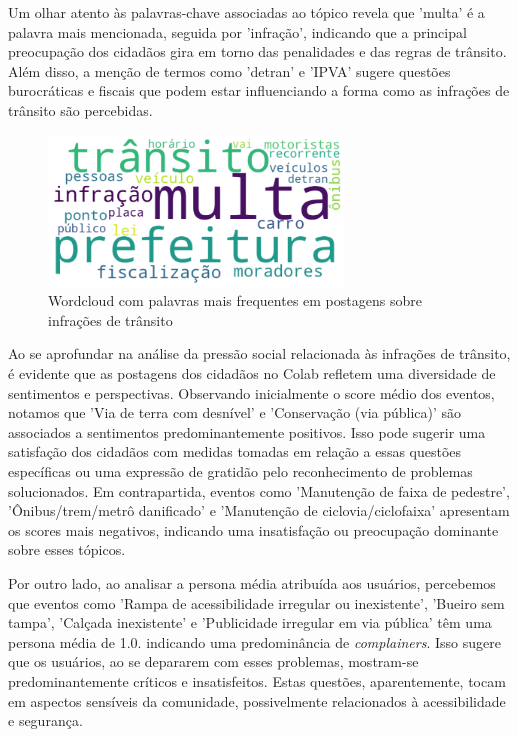 Um olhar atento às palavras-chave associadas ao tópico revela que 'multa' é a palavra mais mencionada, seguida por 'infração', indicando que a principal preocupação dos cidadãos gira em torno das penalidades e das regras de trânsito. Além disso, a menção de termos como 'detran' e 'IPVA' sugere questões burocráticas e fiscais que podem estar influenciando a forma como as infrações de trânsito são percebidas.

\begin{figure}[htb]
	\centering
	\includegraphics[width=0.7\textwidth]{images/wordcloud_traffic.png}
	\caption{Wordcloud com palavras mais frequentes em postagens sobre infrações de trânsito}
	\label{fig:wordcloud_traffic}
\end{figure}

Ao se aprofundar na análise da pressão social relacionada às infrações de trânsito, é evidente que as postagens dos cidadãos no Colab refletem uma diversidade de sentimentos e perspectivas. Observando inicialmente o score médio dos eventos, notamos que 'Via de terra com desnível' e 'Conservação (via pública)' são associados a sentimentos predominantemente positivos. Isso pode sugerir uma satisfação dos cidadãos com medidas tomadas em relação a essas questões específicas ou uma expressão de gratidão pelo reconhecimento de problemas solucionados. Em contrapartida, eventos como 'Manutenção de faixa de pedestre', 'Ônibus/trem/metrô danificado' e 'Manutenção de ciclovia/ciclofaixa' apresentam os scores mais negativos, indicando uma insatisfação ou preocupação dominante sobre esses tópicos.

Por outro lado, ao analisar a persona média atribuída aos usuários, percebemos que eventos como 'Rampa de acessibilidade irregular ou inexistente', 'Bueiro sem tampa', 'Calçada inexistente' e 'Publicidade irregular em via pública' têm uma persona média de 1.0. indicando uma predominância de \textit{complainers}. Isso sugere que os usuários, ao se depararem com esses problemas, mostram-se predominantemente críticos e insatisfeitos. Estas questões, aparentemente, tocam em aspectos sensíveis da comunidade, possivelmente relacionados à acessibilidade e segurança.

